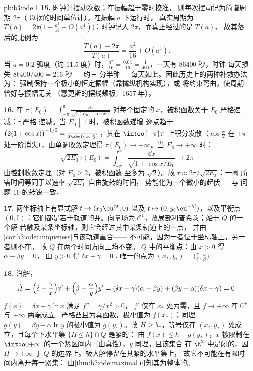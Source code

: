\begin{solution}{pb:b3:ode:1}
\textbf{15.} 时钟计摆动次数；在振幅趋于零时校准，
则每次摆动记为简谐周期 $2\pi$（
以摆的时间单位计）。在振幅 $a$ 下运行时，
真实周期为 $T(a) = 2\pi\bigl(1 + \frac{a^2}{16} +
O(a^4)\bigr)$：时钟记入 $2\pi$，而真正经过的是 $T(a)$，
故其落后的比例为
\[
\frac{T(a) - 2\pi}{T(a)} = \frac{a^2}{16} + O(a^4) .
\]
当 $a = 0.2$ 弧度（约 $11.5$ 度）时，$\frac{a^2}{16} =
\frac{0.04}{16} = \frac1{400}$，一天有 $86400$ 秒，时钟
每天损失 $86400/400 = 216$ 秒 --- 约三
分半钟 --- 每天如此。因此历史上的两种补救办法为：
强制保持一个极小的恒定振幅（靠擒纵机构实现），或
将约束弯曲，使周期恰好与振幅无关
（惠更斯的摆线颊板，1657 年）。

\textbf{16.} 在 $\tau(E_0) = \int_{-\pi}^{\pi}\frac{\dd
x}{\sqrt{2(E_0 + \cos x)}}$ 对每个固定的
$x$，被积函数关于 $E_0$ 严格递减：$\tau$ 严格
递减。当 $E_0 \downarrow 1$ 时，被积函数递增
逐点趋于 $\bigl(2(1 + \cos x)\bigr)^{-1/2} =
\frac1{2\abs{\cos\frac x2}}$，其在
$\intoo{-\pi}\pi$ 上积分发散（$\cos\frac x2$ 在
$\pm\pi$ 处一阶消失），由单调收敛定理得 $\tau(E_0)
\to +\infty$。当 $E_0 \to +\infty$ 时：
\[
\sqrt{2E_0}\,\tau(E_0) = \int_{-\pi}^{\pi}
\frac{\dd x}{\sqrt{1 + \cos x/E_0}} \longrightarrow 2\pi
\]
由控制收敛定理（对 $E_0 \geq 2$，被积函数
至多为 $\sqrt2$）。故 $\tau \approx 2\pi/\sqrt{2E_0}$：一圈
所需时间等同于以速率 $\sqrt{2E_0}$ 自由旋转的时间，
势能化为一个微小的起伏 --- 与
问题 10 的转速一致。

\textbf{17.} 两坐标轴上有显式解 $t
\mapsto (x_0\eu^{\alpha t}, 0)$ 以及 $t \mapsto (0,
y_0\eu^{-\gamma t})$，以及平衡点
$(0, 0)$：它们都是若干轨道的并。向量场为 $\mathcal
C^1$，故局部利普希茨；始于 $Q$ 的一个解
若触及某条坐标轴，则它会经过其中某条轨道上的一点，
并由\cref{cor:b3:ode:uniqueness}与该轨道重合——
不可能，因为一者位于坐标轴上，另一者则不在。
故 $Q$ 在两个时间方向上均不变。
$Q$ 中的平衡点：由 $x > 0$ 得 $\alpha - \beta y = 0$，
由 $y > 0$ 得 $\delta x - \gamma = 0$：唯一的点为
$(x_*, y_*) = \bigl(\frac\gamma\delta,
\frac\alpha\beta\bigr)$.

\textbf{18.} 沿解，
\[
\dot H = \Bigl(\delta - \frac\gamma x\Bigr)x' +
\Bigl(\beta - \frac\alpha y\Bigr)y'
= (\delta x - \gamma)(\alpha - \beta y) +
(\beta y - \alpha)(\delta x - \gamma) = 0 .
\]
$f(x) = \delta x - \gamma\ln x$ 满足 $f'' = \gamma/x^2 > 0$，
$f'$ 仅在 $x_*$ 处为零，且 $f \to +\infty$ 在
$0^+$ 与 $+\infty$ 两端成立：严格凸且为真函数，极小值为
$f(x_*)$；同理 $g(y) = \beta y - \alpha\ln y$ 的极小值为
$g(y_*)$。故 $H \geq h_*$，等号仅在 $(x_*,
y_*)$ 处成立，且每个下水平集 $\{H \leq h\}\cap Q$ 是紧的：
由 $f(x) \leq h - g(y_*)$，$x$ 被限制在
$\intoo0{+\infty}$ 的一个紧区间内（由真性），$y$ 同理，且该集合
在 $\R^2$ 中是闭的，因 $H \to +\infty$ 于
$Q$ 的边界上。极大解停留在其紧的水平集上，
故它不可能在有限时间内离开每一紧集：
由\cref{thm:b3:ode:maximal}可知其为整体的。


\end{solution}
